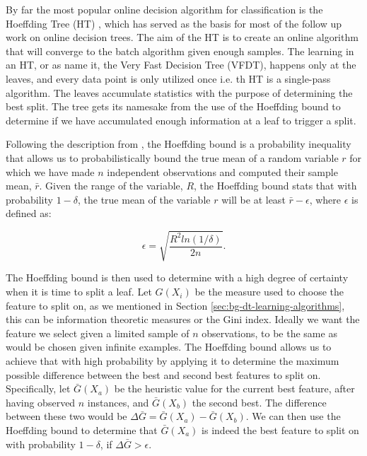 By far the most popular online decision algorithm for classification is the Hoeffding Tree (HT) \cite{vfdt},
which has served as the basis for most of the follow up work on online decision
trees. The aim of the HT is to create an online algorithm that will converge
to the batch algorithm given enough samples.
The learning in an HT, or as \citet{vfdt} name it, the Very Fast Decision
Tree (VFDT), happens only at the leaves, and every data point is only utilized
once i.e. th HT is a single-pass algorithm. The leaves accumulate statistics
with the purpose of determining the best split. The tree gets its
namesake from the use of the Hoeffding bound to determine if we have accumulated
enough information at a leaf to trigger a split.

Following the description from \citet{vfdt}, the Hoeffding bound \cite{hoeffding-bound} is a probability inequality that allows
us to probabilistically  bound the true mean of a random variable $r$ for which we have
made $n$ independent observations and computed their sample mean, $\bar{r}$. Given
the range of the variable, $R$, the Hoeffding bound stats that with probability
$1-\delta$, the true mean of the variable $r$ will be at least $\bar{r}-\epsilon$, where
$\epsilon$ is defined as:

\begin{equation}
	\epsilon = \sqrt{\frac{R^2ln(1/\delta)}{2n}}.
\end{equation}

The Hoeffding bound is then used to determine with a high degree of certainty when
it is time to split a leaf. Let $G(X_i)$ be the measure used to choose the feature
to split on, as we mentioned in Section \ref{sec:bg-dt-learning-algorithms}, this can be
information theoretic measures or the Gini index. Ideally we want the feature we select given a limited sample of $n$ observations, to be the same as would be chosen given infinite examples.
The Hoeffding bound allows us to achieve that with high probability by applying
it to determine the maximum possible difference between the best and second best
features to split on. Specifically, let $\bar{G}(X_a)$ be the heuristic value for the
current best feature, after having observed $n$ instances, and $\bar{G}(X_b)$ the second
best. The difference between these two would be $\Delta \bar{G} = \bar{G}(X_a) - \bar{G}(X_b)$.
We can then use the Hoeffding bound to determine that $\bar{G}(X_a)$ is indeed the
best feature to split on with probability $1-\delta$, if $\Delta \bar{G} > \epsilon$.

